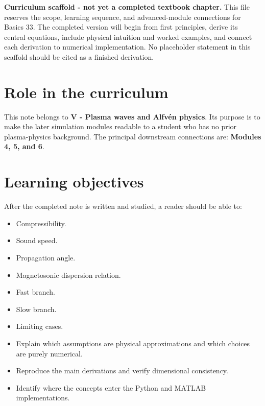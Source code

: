 \documentclass[11pt]{article}
\begin{document}

\begin{overviewbox}
\textbf{Curriculum scaffold - not yet a completed textbook chapter.} This file reserves the scope, learning sequence, and advanced-module connections for Basics 33. The completed version will begin from first principles, derive its central equations, include physical intuition and worked examples, and connect each derivation to numerical implementation. No placeholder statement in this scaffold should be cited as a finished derivation.
\end{overviewbox}

\ProjectTOC

\section{Role in the curriculum}
This note belongs to \textbf{V - Plasma waves and Alfv\'en physics}. Its purpose is to make the later simulation modules readable to a student who has no prior plasma-physics background. The principal downstream connections are: \textbf{Modules 4, 5, and 6}.

\section{Learning objectives}
After the completed note is written and studied, a reader should be able to:
\begin{itemize}[leftmargin=1.6em]
\item Compressibility.
\item Sound speed.
\item Propagation angle.
\item Magnetosonic dispersion relation.
\item Fast branch.
\item Slow branch.
\item Limiting cases.
\item Explain which assumptions are physical approximations and which choices are purely numerical.
\item Reproduce the main derivations and verify dimensional consistency.
\item Identify where the concepts enter the Python and MATLAB implementations.
\end{itemize}
\end{document}
